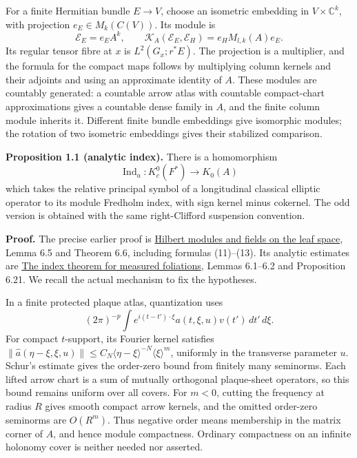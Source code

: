 \documentclass[
  11pt,
]{article}
\begin{document}
For a finite Hermitian bundle \(E\to V\), choose an isometric embedding
in \(V\times\mathbb C^k\), with projection \(e_E\in M_k(C(V))\). Its
module is \[
 \mathscr E_E=e_E A^k,\qquad
 \mathcal K_A(\mathscr E_E,\mathscr E_H)=e_HM_{l,k}(A)e_E.
 \tag{1.1}
\] Its regular tensor fibre at \(x\) is \(L^2(G_x;r^*E)\). The
projection is a multiplier, and the formula for the compact maps follows
by multiplying column kernels and their adjoints and using an
approximate identity of \(A\). These modules are countably generated: a
countable arrow atlas with countable compact-chart approximations gives
a countable dense family in \(A\), and the finite column module inherits
it. Different finite bundle embeddings give isomorphic modules; the
rotation of two isometric embeddings gives their stabilized comparison.

\textbf{Proposition 1.1 (analytic index).} There is a homomorphism \[
 \operatorname{Ind}_a:K_c^0(F^*)\longrightarrow K_0(A)
 \tag{1.2}
\] which takes the relative principal symbol of a longitudinal classical
elliptic operator to its module Fredholm index, with sign kernel minus
cokernel. The odd version is obtained with the same right-Clifford
suspension convention.

\textbf{Proof.} The precise earlier proof is
\href{../NCG-FOLIATIONS/hilbert-modules-and-fields-on-the-leaf-space.html\#section-6}{Hilbert
modules and fields on the leaf space}, Lemma 6.5 and Theorem 6.6,
including formulas (11)--(13). Its analytic estimates are
\href{../NCG-FOLIATIONS/the-index-theorem-for-measured-foliations.html\#section-6}{The
index theorem for measured foliations}, Lemmas 6.1--6.2 and Proposition
6.21. We recall the actual mechanism to fix the hypotheses.

In a finite protected plaque atlas, quantization uses \[
 (2\pi)^{-p}\int e^{i(t-t')\cdot\xi}a(t,\xi,u)v(t')\,dt'\,d\xi .
\] For compact \(t\)-support, its Fourier kernel satisfies
\(\|\widehat a(\eta-\xi,\xi,u)\|\le C_N\langle\eta-\xi\rangle^{-N}\langle\xi\rangle^m\),
uniformly in the transverse parameter \(u\). Schur's estimate gives the
order-zero bound from finitely many seminorms. Each lifted arrow chart
is a sum of mutually orthogonal plaque-sheet operators, so this bound
remains uniform over all covers. For \(m<0\), cutting the frequency at
radius \(R\) gives smooth compact arrow kernels, and the omitted
order-zero seminorms are \(O(R^m)\). Thus negative order means
membership in the matrix corner of \(A\), and hence module compactness.
Ordinary compactness on an infinite holonomy cover is neither needed nor
asserted.
\end{document}
